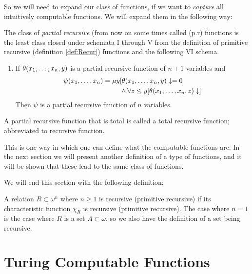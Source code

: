 \documentclass[../main.tex]{subfiles}
\begin{document}
So we will need to expand our class of functions, if we want to
\textit{capture} all intuitively computable functions. 
We will expand them in the following way:
\begin{defi}
		The class of \textit{partial recursive} (from now on some times
		called (p.r) functions is the least class closed under schemata
		I through V from the definition of primitive recursive
		(definition \ref{def:Recur})
		functions and the following VI schema. 
		\begin{enumerate}[label=\Roman*., start=6]
			\item If $\theta(x_1,\ldots,x_n,y)$ is a partial recursive function
				of $n+1$ variables and 
				\begin{align*}
					\psi(x_1,\ldots,x_n)=\mu
					y&[\theta(x_1,\ldots,x_n,y)\downarrow=0\\
						&\wedge \forall z\leq y
					[\theta(x_1,\ldots,x_n,z)\downarrow]
				\end{align*}
				Then $\psi$ is a partial recursive function of
				$n$ variables.
		\end{enumerate}
		A partial recursive function that is total is called a total
		recursive function; abbreviated to recursive function.
\end{defi}

This is one way in which one can define what the computable functions are. In
the next section we will present another definition of a type of functions,
and it will be shown that these lead to the same class of functions.

We will end this section with the following definition:
\begin{defi}
	A relation $R\subset\omega^n$ where $n\geq 1$ is recursive (primitive
	recursive) if its characteristic function $\chi_R$ is recursive
	(primitive recursive). The case where $n=1$ is the case where $R$ is a
	set $A\subset\omega$, so we also have the definition of a set being
	recursive.
\end{defi}

\section{Turing Computable Functions}
\end{document}

